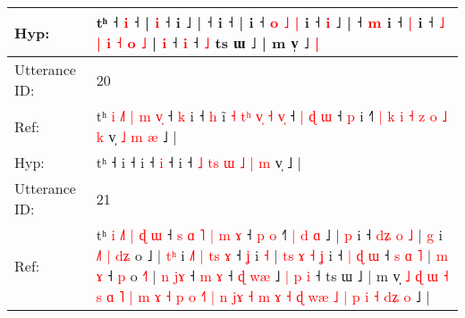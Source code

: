 \documentclass[10pt]{article}
\DeclareRobustCommand{\hl}[1]{{\textcolor{red}{#1}}}
\begin{document}
\begin{longtable}{ll}
 \\
Hyp: & t\hl{}\hl{}\hl{}\hl{}\hl{}\hl{}\hl{}\hl{}\hl{}\hl{}\hl{}ʰ\hl{}\hl{} ˧ \hl{}\hl{i} ˧\hl{}\hl{}\hl{}\hl{}\hl{}\hl{} |\hl{}\hl{}\hl{}\hl{}\hl{}\hl{}\hl{}\hl{} \hl{}\hl{i} ˧\hl{}\hl{}\hl{}\hl{}\hl{}\hl{}\hl{}\hl{}\hl{}\hl{}\hl{} i ˩\hl{}\hl{}\hl{}\hl{}\hl{}\hl{} |\hl{}\hl{}\hl{}\hl{}\hl{} ˧\hl{}\hl{} i ˧ |\hl{}\hl{}\hl{}\hl{}\hl{}\hl{}\hl{}\hl{}\hl{} i ˧\hl{}\hl{} \hl{o} \hl{˩} \hl{|} i\hl{}\hl{}\hl{}\hl{}\hl{}\hl{}\hl{}\hl{}\hl{}\hl{}\hl{}\hl{}\hl{} ˧\hl{}\hl{} \hl{i} ˩ |\hl{}\hl{}\hl{}\hl{}\hl{} ˧ \hl{}\hl{}\hl{m} i ˧ \hl{|} i ˧ \hl{˩} \hl{|} \hl{i} \hl{˧} \hl{o} \hl{˩} |\hl{}\hl{} \hl{i} ˧\hl{}\hl{} \hl{i} ˧\hl{}\hl{}\hl{}\hl{}\hl{}\hl{}\hl{} \hl{˩} ts ɯ ˩ | m v̩ ˩\hl{ }\hl{|}
 \\
\midrule
Utterance ID: & 20 \\
Ref: & tʰ\hl{ }\hl{i}\hl{ }\hl{˩}\hl{˥}\hl{ }\hl{|}\hl{ }\hl{m}\hl{ }\hl{v}\hl{̩} ˧\hl{ }\hl{k} i ˧\hl{ }\hl{h} i\hl{̃}\hl{ }\hl{˧}\hl{ }\hl{t}\hl{ʰ}\hl{ }\hl{v}\hl{̩}\hl{ }\hl{˧}\hl{ }\hl{v}\hl{̩} ˧\hl{ }\hl{|}\hl{ }\hl{ɖ} \hl{ɯ} ˧\hl{ }\hl{p} i ˧\hl{˥}\hl{ }\hl{|} \hl{k} \hl{i}\hl{ }\hl{˧} \hl{z} \hl{o} \hl{˩} \hl{k} v̩\hl{ }\hl{˩}\hl{ }\hl{m}\hl{ }\hl{æ} ˩ |
 \\
Hyp: & tʰ\hl{}\hl{}\hl{}\hl{}\hl{}\hl{}\hl{}\hl{}\hl{}\hl{}\hl{}\hl{} ˧\hl{}\hl{} i ˧\hl{}\hl{} i\hl{}\hl{}\hl{}\hl{}\hl{}\hl{}\hl{}\hl{}\hl{}\hl{}\hl{}\hl{}\hl{}\hl{} ˧\hl{}\hl{}\hl{}\hl{} \hl{i} ˧\hl{}\hl{} i ˧\hl{}\hl{}\hl{} \hl{˩} \hl{}\hl{t}\hl{s} \hl{ɯ} \hl{˩} \hl{|} \hl{m} v̩\hl{}\hl{}\hl{}\hl{}\hl{}\hl{} ˩ |
 \\
\midrule
Utterance ID: & 21 \\
Ref: & tʰ\hl{ }\hl{i}\hl{ }\hl{˩}\hl{˥}\hl{ }\hl{|}\hl{ }\hl{ɖ}\hl{ }\hl{ɯ} ˧\hl{ }\hl{s}\hl{ }\hl{ɑ}\hl{ }\hl{˥}\hl{ }\hl{|}\hl{ }\hl{m} \hl{ɤ} ˧ \hl{p} \hl{o} ˧\hl{˥}\hl{ }\hl{|}\hl{ }\hl{d} \hl{ɑ} ˩ | \hl{p} i ˧\hl{ }\hl{d}\hl{ʑ}\hl{ }\hl{o}\hl{ }\hl{˩} |\hl{ }\hl{g} i\hl{ }\hl{˩}\hl{˥}\hl{ }\hl{|} \hl{d}\hl{ʑ} o ˩ |\hl{ }\hl{t}\hl{ʰ} i\hl{ }\hl{˩}\hl{˥}\hl{ }\hl{|}\hl{ }\hl{t}\hl{s}\hl{ }\hl{ɤ} ˧\hl{ }\hl{ʝ} i \hl{˧} |\hl{ }\hl{t}\hl{s}\hl{ }\hl{ɤ}\hl{ }\hl{˧}\hl{ }\hl{ʝ} i ˧ \hl{|} \hl{ɖ} \hl{ɯ} ˧\hl{ }\hl{s} \hl{ɑ} \hl{˥} |\hl{ }\hl{m}\hl{ }\hl{ɤ} ˧\hl{ }\hl{p} o \hl{˧}\hl{˥} |\hl{ }\hl{n} \hl{j}\hl{ɤ} ˧ \hl{m} \hl{ɤ} ˧\hl{ }\hl{ɖ}\hl{ }\hl{w}\hl{æ} ˩\hl{ }\hl{|} \hl{p} \hl{i} ˧ ts ɯ ˩ | m v̩\hl{ }\hl{˩}\hl{ }\hl{ɖ}\hl{ }\hl{ɯ}\hl{ }\hl{˧}\hl{ }\hl{s}\hl{ }\hl{ɑ}\hl{ }\hl{˥}\hl{ }\hl{|}\hl{ }\hl{m}\hl{ }\hl{ɤ}\hl{ }\hl{˧}\hl{ }\hl{p}\hl{ }\hl{o}\hl{ }\hl{˧}\hl{˥}\hl{ }\hl{|}\hl{ }\hl{n}\hl{ }\hl{j}\hl{ɤ}\hl{ }\hl{˧}\hl{ }\hl{m}\hl{ }\hl{ɤ}\hl{ }\hl{˧}\hl{ }\hl{ɖ}\hl{ }\hl{w}\hl{æ}\hl{ }\hl{˩}\hl{ }\hl{|}\hl{ }\hl{p}\hl{ }\hl{i}\hl{ }\hl{˧}\hl{ }\hl{d}\hl{ʑ}\hl{ }\hl{o} ˩ |

\end{longtable}
\end{document}
